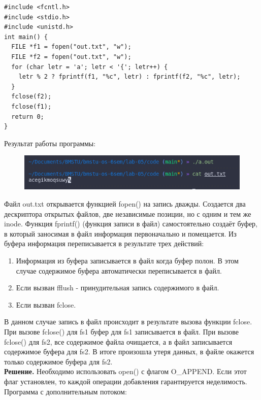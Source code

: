 \begin{lstlisting}
#include <fcntl.h>
#include <stdio.h>
#include <unistd.h>
int main() {
  FILE *f1 = fopen("out.txt", "w");
  FILE *f2 = fopen("out.txt", "w");
  for (char letr = 'a'; letr < '{'; letr++) {
    letr % 2 ? fprintf(f1, "%c", letr) : fprintf(f2, "%c", letr);
  }
  fclose(f2);
  fclose(f1);
  return 0;
}
\end{lstlisting}
Результат работы программы:
\begin{figure}[H]
	\centering
	\includegraphics[scale=0.8]{assets/p_3.png}
\end{figure}
Файл out.txt открывается функцией fopen() на запись дважды. Создается два дескриптора открытых файлов, две независимые позиции, но с одним и тем же inode. Функция fprintf() (функция записи в файл) самостоятельно создаёт буфер, в который заносимая в файл информация первоначально и помещается. Из буфера информация переписывается в результате трех действий:
\begin{enumerate}
	\item Информация из буфера записывается в файл когда буфер полон. В этом случае содержимое буфера автоматически переписывается в файл.
	\item Если вызван fflush - принудительная запись содержимого в файл.
	\item Если вызван fclose.
\end{enumerate}
В данном случае запись в файл происходит в результате вызова функции fclose. При вызове fclose() для fs1 буфер для fs1 записывается в файл. При вызове fclose() для fs2, все содержимое файла очищается, а в файл записывается содержимое буфера для fs2. В итоге произошла утеря данных, в файле окажется только содержимое буфера для fs2. \\
\textbf{Решение.} Необходимо использовать open() с флагом O\_APPEND. Если этот флаг установлен, то каждой операции добавления гарантируется неделимость. \\
Программа с дополнительным потоком:\newpage
